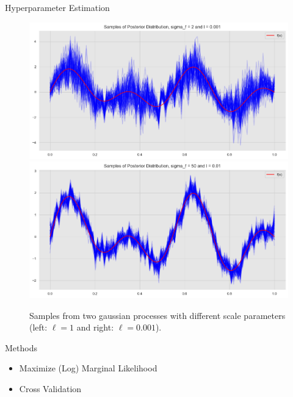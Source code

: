 \documentclass[10pt]{beamer}
\begin{document}
\begin{frame}{Hyperparameter Estimation}{\cite[Chapter 2.3, 5]{RW05}}
\begin{center}
\begin{figure}
\includegraphics[scale=0.21]{images/gaussian_process_regression_files/gaussian_process_regression_68_0.png}
\includegraphics[scale=0.21]{images/gaussian_process_regression_files/gaussian_process_regression_72_0.png}
\caption{Samples from two gaussian processes with different scale parameters (left: $\ell=1$ and right: $\ell = 0.001$).}
\end{figure}
\end{center}
\begin{block}{Methods}
\begin{itemize}
\item Maximize (Log) Marginal Likelihood
\item Cross Validation
\end{itemize}
\end{block}
\end{frame}
\end{document}
